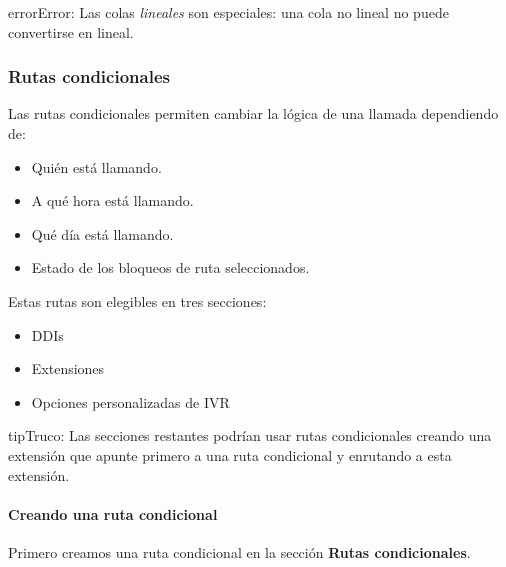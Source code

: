 \documentclass[letterpaper,10pt,spanish]{sphinxmanual}
\begin{document}
\begin{notice}{error}{Error:}
Las colas \emph{lineales} son especiales: una cola no lineal no puede convertirse en lineal.
\end{notice}
\label{administration_portal/client/vpbx/routing_endpoints/conditional_routes:conditional-routes}

\subsubsection{Rutas condicionales}
\label{administration_portal/client/vpbx/routing_endpoints/conditional_routes:id2}\label{administration_portal/client/vpbx/routing_endpoints/conditional_routes::doc}\label{administration_portal/client/vpbx/routing_endpoints/conditional_routes:conditional-routes}\label{administration_portal/client/vpbx/routing_endpoints/conditional_routes:id1}
Las rutas condicionales permiten cambiar la lógica de una llamada dependiendo de:
\begin{itemize}
\item {} 
Quién está llamando.

\item {} 
A qué hora está llamando.

\item {} 
Qué día está llamando.

\item {} 
Estado de los bloqueos de ruta seleccionados.

\end{itemize}

Estas rutas son elegibles en tres secciones:
\begin{itemize}
\item {} 
DDIs

\item {} 
Extensiones

\item {} 
Opciones personalizadas de IVR

\end{itemize}

\begin{notice}{tip}{Truco:}
Las secciones restantes podrían usar rutas condicionales creando una extensión que apunte primero a una ruta condicional y enrutando a esta extensión.
\end{notice}


\paragraph{Creando una ruta condicional}
\label{administration_portal/client/vpbx/routing_endpoints/conditional_routes:creating-a-conditional-route}
Primero creamos una ruta condicional en la sección \textbf{Rutas condicionales}.
\end{document}
